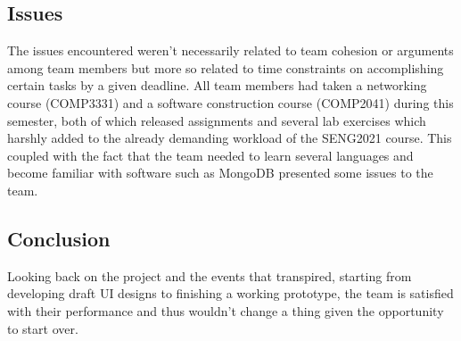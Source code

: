 \documentclass[11pt]{article}
\numberwithin{figure}{section}
\begin{document}
    \subsection{Issues}
        The issues encountered weren’t necessarily related to team cohesion or arguments among team members but more so related to time constraints on accomplishing certain tasks by a given deadline. All team members had taken a networking course (COMP3331) and a software construction course (COMP2041) during this semester, both of which released assignments and several lab exercises which harshly added to the already demanding workload of the SENG2021 course. This coupled with the fact that the team needed to learn several languages and become familiar with software such as MongoDB presented some issues to the team.
    
    \subsection{Conclusion}    
    Looking back on the project and the events that transpired, starting from developing draft UI designs to finishing a working prototype, the team is satisfied with their performance and thus wouldn’t change a thing given the opportunity to start over.
    
\end{document}
